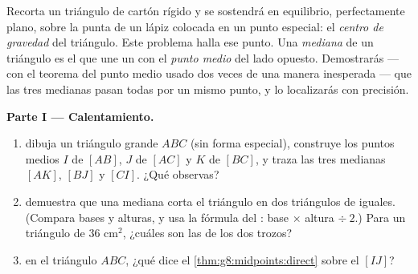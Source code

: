 \begin{problem}
\label{pb:g8:midpoints:1}
Recorta un triángulo de cartón rígido y se sostendrá en equilibrio,
perfectamente plano, sobre la punta de un lápiz colocada en un punto especial: el
\emph{centro de gravedad} del triángulo.
Este problema halla ese punto. Una \emph{mediana} de un
triángulo es el  que une un  con el \emph{punto medio} del
lado opuesto. Demostrarás --- con el teorema del punto medio
usado dos veces de una manera inesperada --- que las tres medianas pasan
todas por un mismo punto, y lo localizarás con precisión.

\medskip
\noindent\textbf{Parte I --- Calentamiento.}
\begin{enumerate}
  \item dibuja un triángulo grande $ABC$ (sin forma especial), construye
        los puntos medios $I$ de $[AB]$, $J$ de $[AC]$ y $K$ de
        $[BC]$, y traza las tres medianas $[AK]$, $[BJ]$ y $[CI]$.
        ¿Qué observas?
  \item demuestra que una mediana corta el triángulo en dos triángulos
        de  iguales. (Compara bases y alturas, y usa la
        fórmula del : base $\times$ altura $\div\ 2$.) Para un
        triángulo de  $36$ cm$^2$, ¿cuáles son las  de los
        dos trozos?
  \item en el triángulo $ABC$, ¿qué dice
        el \cref{thm:g8:midpoints:direct} sobre el 
        $[IJ]$?
\end{enumerate}


\end{problem}
